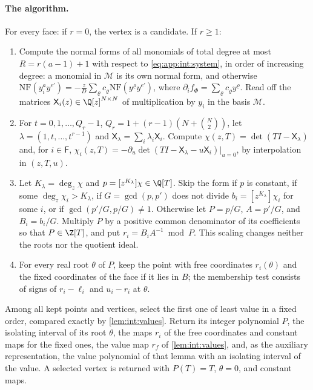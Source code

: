 \paragraph{The algorithm.}
For every face: if $r=0$, the vertex is a candidate. If $r\ge1$:
\begin{enumerate}[label=(\arabic*)]
\item Compute the normal forms of all monomials of total degree at most
$R=r(a-1)+1$ with respect to \eqref{eq:app:int:system}, in order of increasing
degree: a monomial in $\mathcal M$ is its own normal form, and otherwise
$\mathrm{NF}(y_i^ay^{e'})=-\frac zD\sum_\varrho c_\varrho\mathrm{NF}(y^\varrho y^{e'})$,
where $\partial_if_\Phi=\sum_\varrho c_\varrho y^\varrho$. Read off the matrices
$\mathsf X_i(z)\in\Q[z]^{N\times N}$ of multiplication by $y_i$ in the basis
$\mathcal M$.
\item For $t=0,1,\ldots,Q_r-1$, $Q_r=1+(r-1)(N+\binom N2)$, let
$\lambda=(1,t,\ldots,t^{r-1})$ and $\mathsf X_\lambda=\sum_i\lambda_i\mathsf X_i$. Compute
$\chi(z,T)=\det(TI-\mathsf X_\lambda)$ and, for $i\in\mathsf F$,
$\chi_i(z,T)=-\partial_u\det(TI-\mathsf X_\lambda-u\mathsf X_i)\vert_{u=0}$, by interpolation in
$(z,T,u)$.
\item Let $K_\lambda=\deg_z\chi$ and $p=[z^{K_\lambda}]\chi\in\Q[T]$. Skip the
form if $p$ is constant, if some $\deg_z\chi_i>K_\lambda$, if
$G=\gcd(p,p')$ does not divide $b_i=[z^{K_\lambda}]\chi_i$ for some $i$, or if
$\gcd(p'/G,p/G)\ne1$. Otherwise let $P=p/G$, $A=p'/G$, and $B_i=b_i/G$.
Multiply $P$ by a positive common denominator of its coefficients so that
$P\in\Z[T]$, and put $r_i=B_iA^{-1}\bmod P$. This scaling changes neither
the roots nor the quotient ideal.
\item For every real root $\theta$ of $P$, keep the point with free coordinates
$r_i(\theta)$ and the fixed coordinates of the face if it lies in $B$; the
membership test consists of signs of $r_i-\ell_i$ and $u_i-r_i$ at $\theta$.
\end{enumerate}
Among all kept points and vertices, select the first one of least value in
a fixed order, compared exactly by \cref{lem:int:values}. Return its integer
polynomial $P$, the isolating interval
of its root $\theta$, the maps $r_i$ of the free coordinates and constant maps
for the fixed ones, the value map $r_f$ of \cref{lem:int:values}, and, as the
auxiliary representation, the value polynomial of that lemma with an isolating
interval of the value. A selected vertex is returned with $P(T)=T$,
$\theta=0$, and constant maps.

